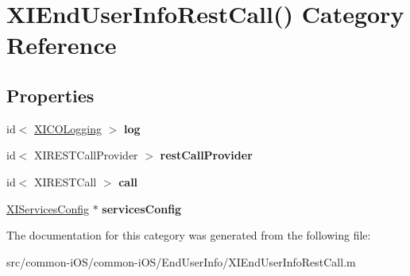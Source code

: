 \hypertarget{category_x_i_end_user_info_rest_call_07_08}{}\section{X\+I\+End\+User\+Info\+Rest\+Call() Category Reference}
\label{category_x_i_end_user_info_rest_call_07_08}
\subsection*{Properties}
\begin{DoxyCompactItemize}
\item 
\hypertarget{category_x_i_end_user_info_rest_call_07_08_ae73e6fd8a657b5926b6775530a1fb78a}{}\label{category_x_i_end_user_info_rest_call_07_08_ae73e6fd8a657b5926b6775530a1fb78a} 
id$<$ \hyperlink{protocol_x_i_c_o_logging-p}{X\+I\+C\+O\+Logging} $>$ {\bfseries log}
\item 
\hypertarget{category_x_i_end_user_info_rest_call_07_08_a525a8c0dcf1b7f2d1e9f695f40cf2a5c}{}\label{category_x_i_end_user_info_rest_call_07_08_a525a8c0dcf1b7f2d1e9f695f40cf2a5c} 
id$<$ X\+I\+R\+E\+S\+T\+Call\+Provider $>$ {\bfseries rest\+Call\+Provider}
\item 
\hypertarget{category_x_i_end_user_info_rest_call_07_08_a4a937e1fbffbdb78653f8c6de744ca6f}{}\label{category_x_i_end_user_info_rest_call_07_08_a4a937e1fbffbdb78653f8c6de744ca6f} 
id$<$ X\+I\+R\+E\+S\+T\+Call $>$ {\bfseries call}
\item 
\hypertarget{category_x_i_end_user_info_rest_call_07_08_a722043490139bbe13c36a531cc45b538}{}\label{category_x_i_end_user_info_rest_call_07_08_a722043490139bbe13c36a531cc45b538} 
\hyperlink{interface_x_i_services_config}{X\+I\+Services\+Config} $\ast$ {\bfseries services\+Config}
\end{DoxyCompactItemize}


The documentation for this category was generated from the following file\+:\begin{DoxyCompactItemize}
\item 
src/common-\/i\+O\+S/common-\/i\+O\+S/\+End\+User\+Info/X\+I\+End\+User\+Info\+Rest\+Call.\+m\end{DoxyCompactItemize}
